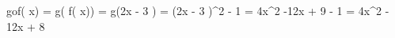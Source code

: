  \\ \\

 \Rightarrow gof\left( x\right) = g\left( f\left( x\right)\right) = g\left(2x - 3 \right) = \left(2x - 3 \right)^{2} - 1 = 4x^{2} -12x + 9 - 1 = 4x^{2} - 12x + 8 
